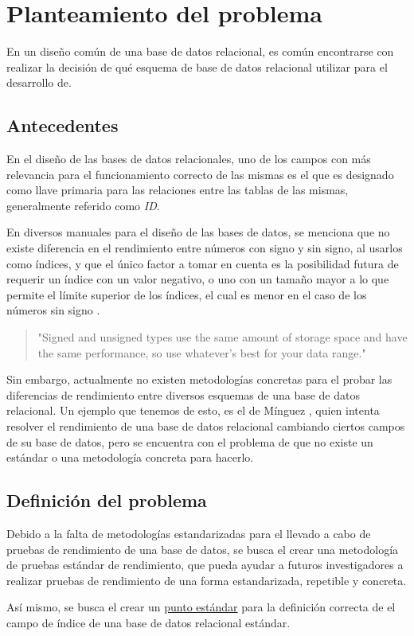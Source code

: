 \section{Planteamiento del problema}

En un diseño común de una base de datos relacional, es común encontrarse con realizar la decisión de qué esquema de base de datos relacional utilizar para el desarrollo de.


\subsection{Antecedentes}

En el diseño de las bases de datos relacionales, uno de los campos con más relevancia para el funcionamiento correcto de las mismas es el que es designado como llave primaria para las relaciones entre las tablas de las mismas, generalmente referido como \textit{ID}.

En diversos manuales para el diseño de las bases de datos, se menciona que no existe diferencia en el rendimiento entre números con signo y sin signo, al usarlos como índices, y que el único factor a tomar en cuenta es la posibilidad futura de requerir un índice con un valor negativo, o uno con un tamaño mayor a lo que permite el límite superior de los índices, el cual es menor en el caso de los números sin signo \cite{Schwartz_2012}.

\begin{quote}
   "Signed and unsigned types use the same amount of storage space and have the same performance, so use whatever’s best for your data range."
   \cite{Schwartz_2012}
\end{quote}

Sin embargo, actualmente no existen metodologías concretas para el probar las diferencias de rendimiento entre diversos esquemas de una base de datos relacional. Un ejemplo que tenemos de esto, es el de Mínguez \cite{Minguez_rendimiento}, quien intenta resolver el rendimiento de una base de datos relacional cambiando ciertos campos de su base de datos, pero se encuentra con el problema de que no existe un estándar o una metodología concreta para hacerlo.

\subsection{Definición del problema}

Debido a la falta de metodologías estandarizadas para el llevado a cabo de pruebas de rendimiento de una base de datos, se busca el crear una metodología de pruebas estándar de rendimiento, que pueda ayudar a futuros investigadores a realizar pruebas de rendimiento de una forma estandarizada, repetible y concreta.

Así mismo, se busca el crear un \underline{punto estándar} para la definición correcta de el campo de índice de una base de datos relacional estándar.
